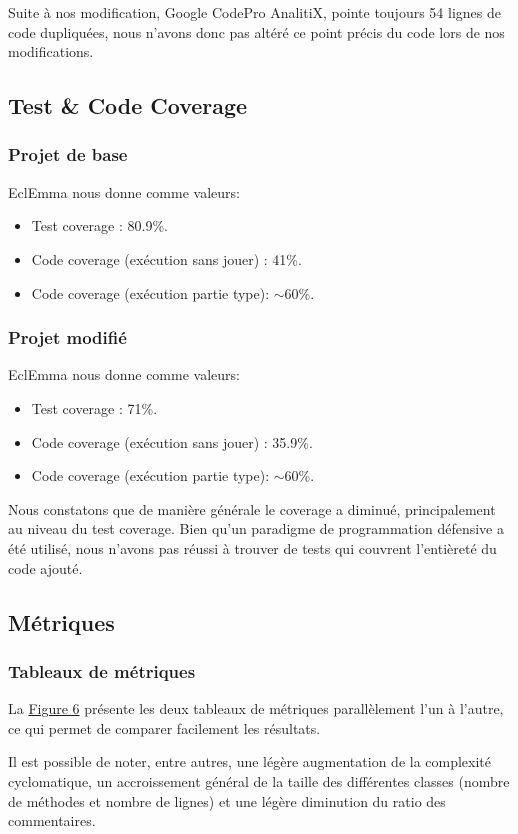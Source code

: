 \documentclass[a4paper,12pt]{report} %
\begin{document}
Suite à nos modification, Google CodePro AnalitiX, pointe toujours 54 lignes de code dupliquées,
nous n'avons donc pas altéré ce point précis du code lors de nos modifications.


\subsection{Test \& Code Coverage}
\subsubsection{Projet de base}
EclEmma nous donne comme valeurs:
\begin{itemize}
\item Test coverage : 80.9\%.
\item Code coverage (exécution sans jouer) : 41\%.
\item Code coverage (exécution partie type): $\sim$60\%.
\end{itemize}

\subsubsection{Projet modifié}
EclEmma nous donne comme valeurs:
\begin{itemize}
\item Test coverage : 71\%.
\item Code coverage (exécution sans jouer) : 35.9\%.
\item Code coverage (exécution partie type): $\sim$60\%.
\end{itemize}
Nous constatons que de manière générale le coverage a diminué, principalement
au niveau du test coverage. Bien qu'un paradigme de programmation
défensive a été utilisé, nous n'avons pas réussi à trouver de tests
qui couvrent l'entièreté du code ajouté.

\subsection{Métriques}
\subsubsection{Tableaux de métriques}

La \hyperref[figure6]{Figure 6} présente les deux tableaux de métriques parallèlement l'un à l'autre, ce
qui permet de comparer facilement les résultats.

Il est possible de noter, entre autres, une légère augmentation de la complexité
cyclomatique, un accroissement général de la taille des différentes
classes (nombre de méthodes et nombre de lignes) et une légère diminution
du ratio des commentaires.
\end{document}
